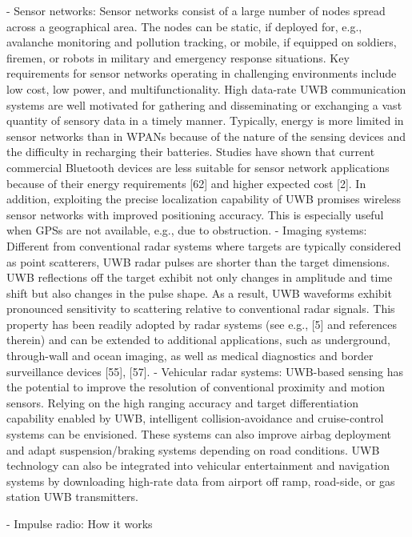 	- Sensor networks: Sensor networks consist of a large number of nodes spread across a geographical area. The nodes can be static, if deployed for, e.g., avalanche monitoring and pollution tracking, or mobile, if equipped on soldiers, firemen, or robots in military and emergency response situations. Key requirements for sensor networks operating in challenging environments include low cost, low power, and multifunctionality. High data-rate UWB communication systems are well motivated for gathering and disseminating or exchanging a vast quantity of sensory data in a timely manner. Typically, energy is more limited in sensor networks than in WPANs because of the nature of the sensing devices and the difficulty in recharging their batteries. Studies have shown that current commercial Bluetooth devices are less suitable for sensor network applications because of their energy requirements [62] and higher expected cost [2]. In addition, exploiting the precise localization capability of UWB promises wireless sensor networks with improved positioning accuracy. This is especially useful when GPSs are not available, e.g., due to obstruction.
	- Imaging systems: Different from conventional radar systems where targets are typically considered as point scatterers, UWB radar pulses are shorter than the target dimensions. UWB reflections off the target exhibit not only changes in amplitude and time shift but also changes in the pulse shape. As a result, UWB waveforms exhibit pronounced sensitivity to scattering relative to conventional radar signals. This property has been readily adopted by radar systems (see e.g., [5] and references therein) and can be extended to additional applications, such as underground, through-wall and ocean imaging, as well as medical diagnostics and border surveillance devices [55], [57].
	- Vehicular radar systems: UWB-based sensing has the potential to improve the resolution of conventional proximity and motion sensors. Relying on the high ranging accuracy and target differentiation capability enabled by UWB, intelligent collision-avoidance and cruise-control systems can be envisioned. These systems can also improve airbag deployment and adapt suspension/braking systems depending on road conditions. UWB technology can also be integrated into vehicular entertainment and navigation systems by downloading high-rate data from airport off ramp, road-side, or gas station UWB transmitters.
	
\cite{win1998impulse}
	- Impulse radio: How it works
	
